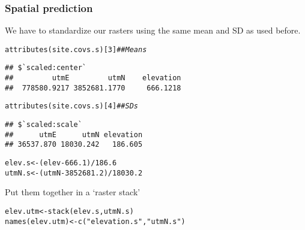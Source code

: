 \documentclass[color=usenames,dvipsnames]{beamer}\usepackage[]{graphicx}\usepackage[]{color}
\makeatletter
\newcommand{\hlnum}[1]{\textcolor[rgb]{0.69,0.494,0}{#1}}%
\newcommand{\hlstr}[1]{\textcolor[rgb]{0.749,0.012,0.012}{#1}}%
\newcommand{\hlcom}[1]{\textcolor[rgb]{0.514,0.506,0.514}{\textit{#1}}}%
\newcommand{\hlopt}[1]{\textcolor[rgb]{0,0,0}{#1}}%
\newcommand{\hlstd}[1]{\textcolor[rgb]{0,0,0}{#1}}%
\newcommand{\hlkwb}[1]{\textcolor[rgb]{0,0.341,0.682}{#1}}%
\newcommand{\hlkwd}[1]{\textcolor[rgb]{0.004,0.004,0.506}{#1}}%
\newenvironment{kframe}{%
 \def\at@end@of@kframe{}%
 \ifinner\ifhmode%
  \def\at@end@of@kframe{\end{minipage}}%
  \begin{minipage}{\columnwidth}%
 \fi\fi%
 \def\FrameCommand##1{\hskip\@totalleftmargin \hskip-\fboxsep
 \colorbox{shadecolor}{##1}\hskip-\fboxsep
     \hskip-\linewidth \hskip-\@totalleftmargin \hskip\columnwidth}%
 \MakeFramed {\advance\hsize-\width
   \@totalleftmargin\z@ \linewidth\hsize
   \@setminipage}}%
 {\par\unskip\endMakeFramed%
 \at@end@of@kframe}
\newenvironment{knitrout}{}{} %
\makeatother
\begin{document}
\begin{frame}[fragile]
  \frametitle{Spatial prediction}
  We have to standardize our rasters \alert{using the same mean and SD
    as used before}.  
\begin{knitrout}\scriptsize
{}\color{fgcolor}\begin{kframe}
\begin{alltt}
\hlkwd{attributes}\hlstd{(site.covs.s)[}\hlnum{3}\hlstd{]} \hlcom{## Means}
\end{alltt}
\begin{verbatim}
## $`scaled:center`
##         utmE         utmN    elevation 
##  778580.9217 3852681.1770     666.1218
\end{verbatim}
\begin{alltt}
\hlkwd{attributes}\hlstd{(site.covs.s)[}\hlnum{4}\hlstd{]} \hlcom{## SDs}
\end{alltt}
\begin{verbatim}
## $`scaled:scale`
##      utmE      utmN elevation 
## 36537.870 18030.242   186.605
\end{verbatim}
\end{kframe}
\end{knitrout}
\pause
\vfill
\begin{knitrout}\scriptsize
{}\color{fgcolor}\begin{kframe}
\begin{alltt}
\hlstd{elev.s} \hlkwb{<-} \hlstd{(elev}\hlopt{-}\hlnum{666.1}\hlstd{)}\hlopt{/}\hlnum{186.6}
\hlstd{utmN.s} \hlkwb{<-} \hlstd{(utmN}\hlopt{-}\hlnum{3852681.2}\hlstd{)}\hlopt{/}\hlnum{18030.2}
\end{alltt}
\end{kframe}
\end{knitrout}
\pause
\vfill
Put them together in a `raster stack'
\begin{knitrout}\scriptsize
{}\color{fgcolor}\begin{kframe}
\begin{alltt}
\hlstd{elev.utm} \hlkwb{<-} \hlkwd{stack}\hlstd{(elev.s,utmN.s)}
\hlkwd{names}\hlstd{(elev.utm)} \hlkwb{<-} \hlkwd{c}\hlstd{(}\hlstr{"elevation.s"}\hlstd{,} \hlstr{"utmN.s"}\hlstd{)}
\end{alltt}
\end{kframe}
\end{knitrout}
\end{frame}
\end{document}
